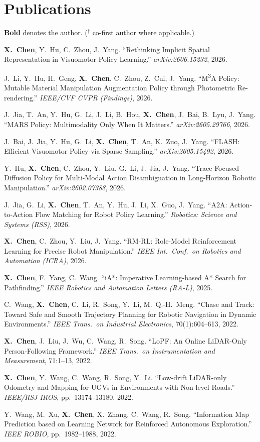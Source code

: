 \documentclass[11pt,a4paper]{article}
\begin{document}
\section{Publications}
{\small \textbf{Bold} denotes the author. ($^{\dagger}$ co-first author where applicable.)}
\begin{enumerate}[label={[\arabic*]}]
  \item \textbf{X.\ Chen}, Y.\ Hu, C.\ Zhou, J.\ Yang. ``Rethinking Implicit Spatial Representation in Visuomotor Policy Learning.'' \textit{arXiv:2606.15232}, 2026.
  \item J.\ Li, Y.\ Hu, H.\ Geng, \textbf{X.\ Chen}, C.\ Zhou, Z.\ Cui, J.\ Yang. ``M\textsuperscript{3}A Policy: Mutable Material Manipulation Augmentation Policy through Photometric Re-rendering.'' \textit{IEEE/CVF CVPR (Findings)}, 2026.
  \item J.\ Jia, T.\ An, Y.\ Hu, G.\ Li, J.\ Li, B.\ Hou, \textbf{X.\ Chen}, J.\ Bai, B.\ Lyu, J.\ Yang. ``MARS Policy: Multimodality Only When It Matters.'' \textit{arXiv:2605.29766}, 2026.
  \item J.\ Bai, J.\ Jia, Y.\ Hu, G.\ Li, \textbf{X.\ Chen}, T.\ An, K.\ Zuo, J.\ Yang. ``FLASH: Efficient Visuomotor Policy via Sparse Sampling.'' \textit{arXiv:2605.15492}, 2026.
  \item Y.\ Hu, \textbf{X.\ Chen}, C.\ Zhou, Y.\ Liu, G.\ Li, J.\ Jia, J.\ Yang. ``Trace-Focused Diffusion Policy for Multi-Modal Action Disambiguation in Long-Horizon Robotic Manipulation.'' \textit{arXiv:2602.07388}, 2026.
  \item J.\ Jia, G.\ Li, \textbf{X.\ Chen}, T.\ An, Y.\ Hu, J.\ Li, X.\ Guo, J.\ Yang. ``A2A: Action-to-Action Flow Matching for Robot Policy Learning.'' \textit{Robotics: Science and Systems (RSS)}, 2026.
  \item \textbf{X.\ Chen}, C.\ Zhou, Y.\ Liu, J.\ Yang. ``RM-RL: Role-Model Reinforcement Learning for Precise Robot Manipulation.'' \textit{IEEE Int.\ Conf.\ on Robotics and Automation (ICRA)}, 2026.
  \item \textbf{X.\ Chen}, F.\ Yang, C.\ Wang. ``iA*: Imperative Learning-based A* Search for Pathfinding.'' \textit{IEEE Robotics and Automation Letters (RA-L)}, 2025.
  \item C.\ Wang, \textbf{X.\ Chen}, C.\ Li, R.\ Song, Y.\ Li, M.\ Q.-H.\ Meng. ``Chase and Track: Toward Safe and Smooth Trajectory Planning for Robotic Navigation in Dynamic Environments.'' \textit{IEEE Trans.\ on Industrial Electronics}, 70(1):604--613, 2022.
  \item \textbf{X.\ Chen}, J.\ Liu, J.\ Wu, C.\ Wang, R.\ Song. ``LoPF: An Online LiDAR-Only Person-Following Framework.'' \textit{IEEE Trans.\ on Instrumentation and Measurement}, 71:1--13, 2022.
  \item \textbf{X.\ Chen}, Y.\ Wang, C.\ Wang, R.\ Song, Y.\ Li. ``Low-drift LiDAR-only Odometry and Mapping for UGVs in Environments with Non-level Roads.'' \textit{IEEE/RSJ IROS}, pp.\ 13174--13180, 2022.
  \item Y.\ Wang, M.\ Xu, \textbf{X.\ Chen}, X.\ Zhang, C.\ Wang, R.\ Song. ``Information Map Prediction based on Learning Network for Reinforced Autonomous Exploration.'' \textit{IEEE ROBIO}, pp.\ 1982--1988, 2022.
\end{enumerate}
\end{document}
